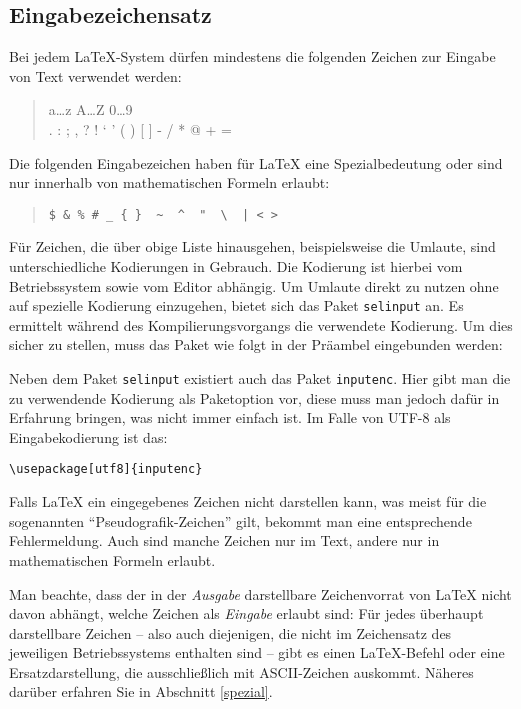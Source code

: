 \subsection{Eingabezeichensatz}\label{inputenc}

Bei jedem \LaTeX-System dürfen mindestens die folgenden Zeichen zur Eingabe von
Text verwendet werden:
\begin{quote}
  \ttfamily
  a\dots z A\dots Z 0\dots 9 \\
  . : ; , ? ! ` ' ( ) [ ] - / * @ + =
\end{quote}
Die folgenden Eingabezeichen haben für \LaTeX{} eine Spezialbedeutung oder sind
nur innerhalb von mathematischen Formeln erlaubt:
\begin{quote}
\verb.$ & % # _ { }  ~  ^  "  \  | < >.
\end{quote}
Für Zeichen, die über obige Liste hinausgehen, beispielsweise die Umlaute, sind
unterschiedliche Kodierungen in
Gebrauch. Die Kodierung ist hierbei vom Betriebssystem sowie vom Editor
abhängig. Um Umlaute direkt zu nutzen ohne auf spezielle Kodierung einzugehen,
bietet sich das Paket \texttt{selinput} an. Es ermittelt während des
Kompilierungsvorgangs die verwendete Kodierung. Um dies sicher zu stellen, muss
das Paket wie folgt in der Präambel eingebunden werden:
\begin{example}[caption={Bestimmung der Kodierung für die Nutzung von Umlauten},]
 \usepackage{selinput}
 \usepackage[T1]{fontenc}
\end{example}

Neben dem Paket \texttt{selinput} existiert auch das Paket \texttt{inputenc}.
Hier gibt man die zu verwendende Kodierung als Paketoption vor, diese muss man
jedoch dafür in Erfahrung bringen, was nicht immer einfach ist. Im Falle von
UTF-8 als Eingabekodierung ist das:

\begin{beispiel}
	\lstinline+\usepackage[utf8]{inputenc}+
\end{beispiel}

Falls \LaTeX{} ein eingegebenes Zeichen nicht darstellen kann, was meist für die
sogenannten "`Pseudografik-Zeichen"' gilt,  bekommt man eine entsprechende
Fehlermeldung. Auch sind manche Zeichen nur im Text, andere nur in
mathematischen Formeln erlaubt.

Man beachte, dass der in der \emph{Ausgabe} darstellbare Zeichenvorrat von
\LaTeX{} nicht davon abhängt, welche Zeichen als \emph{Eingabe} erlaubt sind:
Für jedes überhaupt darstellbare Zeichen -- also auch diejenigen, die nicht im
Zeichensatz des jeweiligen Betriebssystems enthalten sind -- gibt es einen
\LaTeX-Befehl oder eine Ersatzdarstellung, die ausschließlich mit ASCII-Zeichen
auskommt.  Näheres darüber erfahren Sie in Abschnitt \ref{spezial}.

\endinput
